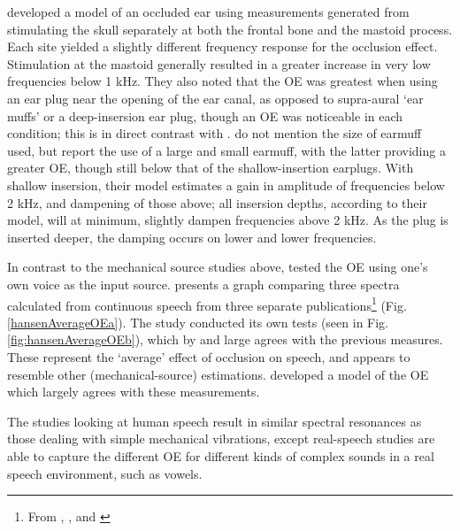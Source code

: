 \documentclass[dissertation,copyright]{uathesis}
\begin{document}
\cite{stenfelt:07} developed a model of an occluded ear using measurements generated from stimulating the skull separately at both the frontal bone and the mastoid process.  Each site yielded a slightly different frequency response for the occlusion effect.  Stimulation at the mastoid generally resulted in a greater increase in very low frequencies below 1 kHz.  They also noted that the OE was greatest when using an ear plug near the opening of the ear canal, as opposed to supra-aural `ear muffs' or a deep-insersion ear plug, though an OE was noticeable in each condition; this is in direct contrast with \cite{dean:00}.  \cite{dean:00} do not mention the size of earmuff used, but \cite{stenfelt:07} report the use of a large and small earmuff, with the latter providing a greater OE, though still below that of the shallow-insertion earplugs.
With shallow insersion, their model estimates a gain in amplitude of frequencies below 2 kHz, and dampening of those above; all insersion depths, according to their model, will at minimum, slightly dampen frequencies above 2 kHz.  As the plug is inserted deeper, the damping occurs on lower and lower frequencies.


In contrast to the mechanical source studies above, \cite{hansen:97b} tested the OE using one's own voice as the input source.  \cite{hansen:97b} presents a graph comparing three spectra calculated from continuous speech from three separate publications\footnote{From \cite{wimmer:86}, \cite{thorup:96}, and \cite{may:92}} (Fig. \ref{hansenAverageOEa}).  The study conducted its own tests (seen in Fig. \ref{fig:hansenAverageOEb}), which by and large agrees with the previous measures.  These represent the `average' effect of occlusion on speech, and appears to resemble other (mechanical-source) estimations.  \cite{hansen:97b} developed a model of the OE which largely agrees with these measurements.

The studies looking at human speech result in similar spectral resonances as those dealing with simple mechanical vibrations, except real-speech studies are able to capture the different OE for different kinds of complex sounds in a real speech environment, such as vowels.  

\end{document}
